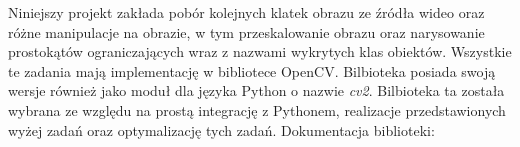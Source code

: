 Niniejszy projekt zakłada pobór kolejnych klatek obrazu ze źródła wideo oraz różne manipulacje na obrazie, w tym przeskalowanie obrazu oraz narysowanie prostokątów ograniczających wraz z nazwami wykrytych klas obiektów. Wszystkie te zadania mają implementację w bibliotece OpenCV. Bilbioteka posiada swoją wersje również jako moduł dla języka Python o nazwie \emph{cv2}. Bilbioteka ta została wybrana ze względu na prostą integrację z Pythonem, realizacje przedstawionych wyżej zadań oraz optymalizację tych zadań. Dokumentacja biblioteki: \cite{OpenCV_docs}


